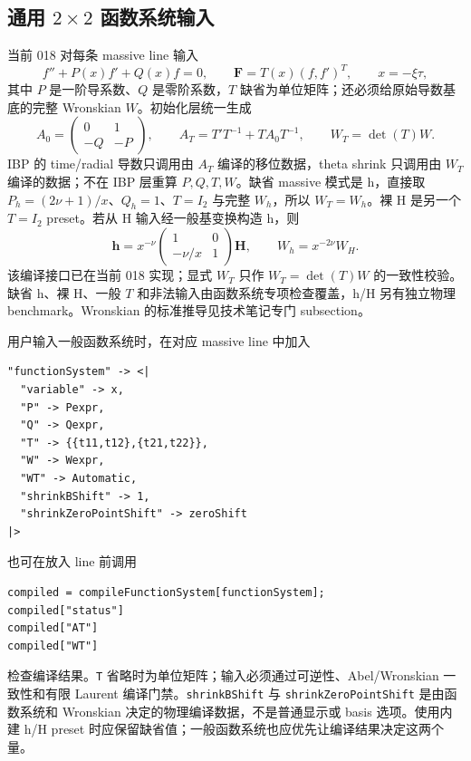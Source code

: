 ﻿\documentclass[a4paper,11pt]{article}
\begin{document}
\subsection{通用 $2\times2$ 函数系统输入}

当前 018 对每条 massive line 输入
\begin{equation}
 f''+P(x)f'+Q(x)f=0,
 \qquad \mathbf F=T(x)(f,f')^T,
 \qquad x=-\xi\tau,
\end{equation}
其中 $P$ 是一阶导系数、$Q$ 是零阶系数，$T$ 缺省为单位矩阵；还必须给原始导数基底的完整 Wronskian $W$。初始化层统一生成
\begin{equation}
 A_0=\begin{pmatrix}0&1\\-Q&-P\end{pmatrix},
 \qquad
 A_T=T'T^{-1}+TA_0T^{-1},
 \qquad
 W_T=\det(T)W.
\end{equation}
IBP 的 time/radial 导数只调用由 $A_T$ 编译的移位数据，theta shrink 只调用由 $W_T$ 编译的数据；不在 IBP 层重算 $P,Q,T,W$。缺省 massive 模式是 h，直接取 $P_h=(2\nu+1)/x$、$Q_h=1$、$T=I_2$ 与完整 $W_h$，所以 $W_T=W_h$。裸 H 是另一个 $T=I_2$ preset。若从 H 输入经一般基变换构造 h，则
\begin{equation}
 \mathbf h=x^{-\nu}\begin{pmatrix}1&0\\-\nu/x&1\end{pmatrix}\mathbf H,
 \qquad W_h=x^{-2\nu}W_H.
\end{equation}
该编译接口已在当前 018 实现；显式 $W_T$ 只作 $W_T=\det(T)W$ 的一致性校验。缺省 h、裸 H、一般 $T$ 和非法输入由函数系统专项检查覆盖，h/H 另有独立物理 benchmark。Wronskian 的标准推导见技术笔记专门 subsection。

用户输入一般函数系统时，在对应 massive line 中加入
\begin{verbatim}
"functionSystem" -> <|
  "variable" -> x,
  "P" -> Pexpr,
  "Q" -> Qexpr,
  "T" -> {{t11,t12},{t21,t22}},
  "W" -> Wexpr,
  "WT" -> Automatic,
  "shrinkBShift" -> 1,
  "shrinkZeroPointShift" -> zeroShift
|>
\end{verbatim}
也可在放入 line 前调用
\begin{verbatim}
compiled = compileFunctionSystem[functionSystem];
compiled["status"]
compiled["AT"]
compiled["WT"]
\end{verbatim}
检查编译结果。\texttt{T} 省略时为单位矩阵；输入必须通过可逆性、Abel/Wronskian 一致性和有限 Laurent 编译门禁。\texttt{shrinkBShift} 与 \texttt{shrinkZeroPointShift} 是由函数系统和 Wronskian 决定的物理编译数据，不是普通显示或 basis 选项。使用内建 h/H preset 时应保留缺省值；一般函数系统也应优先让编译结果决定这两个量。
\end{document}
